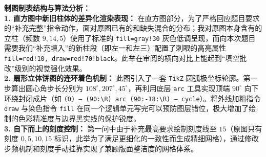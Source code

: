 \vspace{0.4cm}
\begin{center}
\end{center}

\vspace{0.6cm}

{\small\color{blue!70!black}
\textbf{制图制表结构与算法分析：}\\
\textbf{1. 直方图中新旧柱体的差异化渲染表现：} 在直方图部分，为了严格回应题目要求的“补充完整”指令动作，面对原图已有的和缺失混合的分布；我对原图本身含有的立柱（频数 $9, 14, 5$）使用了标准的 \texttt{fill=gray!30} 灰色低调呈现，而向本次题目需要我们“补充填入”的新柱段（即左一和左三）配置了刺眼的高亮属性 \texttt{fill=red!10, draw=red!70!black}。此举在审阅的横向对比上能起到“填空批改”级别的视觉强化效果。\\
\textbf{2. 扇形立体饼图的连环着色机制：} 此图引入了一套 \texttt{TikZ} 圆弧极坐标轮廓。第一步算出圆心角步长分别为 $108^\circ, 207^\circ, 45^\circ$，再利用底层 \texttt{arc} 工具实现顶端 $90^\circ$ 向下环绕封闭成片（如 \texttt{(O) -- (90:\textbackslash R) arc (90:-18:\textbackslash R) -- cycle}）。将外线加粗指令 \texttt{draw} 与染色指令 \texttt{fill} 在同一个逻辑单元写完可以预防图层错位，极大增加了绘制的色彩精准度与边界黑实线的保护锐度。\\
\textbf{3. 自下而上的刻度控制：} 第一问中由于补充最高要求绘制刻度线至 $15$（原图只有刻度 $0,5,10,15$ 标识，此举为了满足更细化的一致性而生成精细网格），通过修改步频机制和刻度手动挂靠实现了兼顾版面整洁度的网格体系。
}

